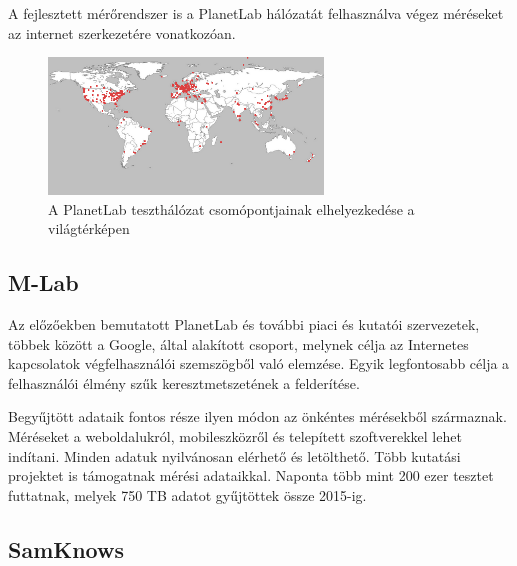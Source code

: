 A fejlesztett mérőrendszer is a PlanetLab hálózatát felhasználva végez méréseket az internet szerkezetére vonatkozóan.

\begin{figure}[!ht]
	\centering
	\includegraphics[width=0.65\textwidth, keepaspectratio]{figures/planetlab_worldmap.png}
	\caption{A PlanetLab teszthálózat csomópontjainak elhelyezkedése a világtérképen\label{fig:planetlab}}
\end{figure}

\subsection{M-Lab}

Az előzőekben bemutatott PlanetLab és további piaci és kutatói szervezetek, többek között a Google, által alakított csoport, melynek célja az Internetes kapcsolatok végfelhasználói szemszögből való elemzése. Egyik legfontosabb célja a felhasználói élmény szűk keresztmetszetének a felderítése.

Begyűjtött adataik fontos része ilyen módon az önkéntes mérésekből származnak. Méréseket a weboldalukról, mobileszközről és telepített szoftverekkel lehet indítani. Minden adatuk nyilvánosan elérhető és letölthető. Több kutatási projektet is támogatnak mérési adataikkal. Naponta több mint 200 ezer tesztet futtatnak, melyek 750 TB adatot gyűjtöttek össze 2015-ig. 



\subsection{SamKnows}

